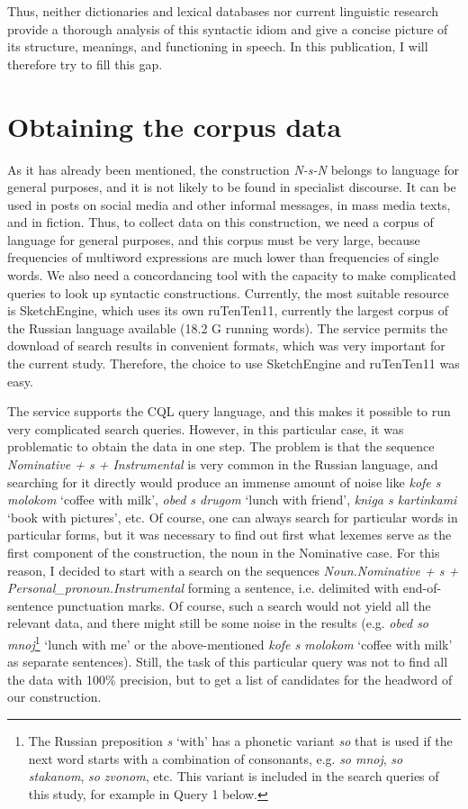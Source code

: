 \documentclass[output=paper]{langscibook}
\begin{document}
Thus, neither dictionaries and lexical databases nor current linguistic research provide a thorough analysis of this syntactic idiom and give a concise picture of its structure, meanings, and functioning in speech. In this publication, I will therefore try to fill this gap.

\section{Obtaining the corpus data}

As it has already been mentioned, the construction \textit{N-s-N} belongs to language for general purposes, and it is not likely to be found in specialist discourse. It can be used in posts on social media and other informal messages, in mass media texts, and in fiction. Thus, to collect data on this construction, we need a corpus of language for general purposes, and this corpus must be very large, because frequencies of multiword expressions are much lower than frequencies of single words. We also need a concordancing tool with the capacity to make complicated queries to look up syntactic constructions. Currently, the most suitable resource is SketchEngine, which uses its own ruTenTen11, currently the largest corpus of the Russian language available (18.2 G running words). The service permits the download of search results in convenient formats, which was very important for the current study. Therefore, the choice to use SketchEngine and ruTenTen11 was easy.

The service supports the CQL query language, and this makes it possible to run very complicated search queries. However, in this particular case, it was problematic to obtain the data in one step. The problem is that the sequence \textit{Nominative + s + Instrumental} is very common in the Russian language, and searching for it directly would produce an immense amount of noise like \textit{kofe s molokom} ‘coffee with milk’, \textit{obed s drugom} ‘lunch with friend’, \textit{kniga s kartinkami} ‘book with pictures’, etc. Of course, one can always search for particular words in particular forms, but it was necessary to find out first what lexemes serve as the first component of the construction, the noun in the Nominative case. For this reason, I decided to start with a search on the sequences \textit{Noun.Nominative + s + Personal\_pronoun.Instrumental} forming a sentence, i.e. delimited with end-of-sentence punctuation marks. Of course, such a search would not yield all the relevant data, and there might still be some noise in the results (e.g. \textit{obed so mnoj}\footnote{The Russian preposition \textit{s} ‘with’ has a phonetic variant \textit{so} that is used if the next word starts with a combination of consonants, e.g. \textit{so mnoj}, \textit{so stakanom}, \textit{so zvonom}, etc. This variant is included in the search queries of this study, for example in Query 1 below.} ‘lunch with me’ or the above-mentioned \textit{kofe s molokom} ‘coffee with milk’ as separate sentences). Still, the task of this particular query was not to find all the data with 100\% precision, but to get a list of candidates for the headword of our construction.
\end{document}
